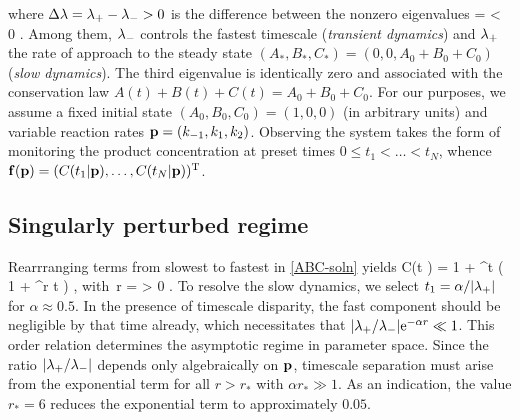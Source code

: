 \label{ABC-soln}
\ee
%
where $\Delta\lambda = \lambda_+-\lambda_- > 0$ is the difference between the nonzero eigenvalues
%
\be
 \lpm
=
<
 0 .
\label{ABC-lambda}
\ee
%
Among them, $\lambda_-$ controls the fastest timescale (\emph{transient dynamics})
and $\lambda_+$ the rate of approach to the steady state $(A_*,B_*,C_*)=(0,0,A_0+B_0+C_0)$ (\emph{slow dynamics}).
The third eigenvalue is identically zero and associated with the conservation law $A(t)+B(t)+C(t)=A_0+B_0+C_0$.
For our purposes, we assume a fixed initial state $(A_0,B_0,C_0)=(1,0,0)$
(in arbitrary units) and variable reaction rates $\mathbf{p} = (k_{-1},k_1,k_2)$.
Observing the system takes the form of monitoring the product concentration at preset times $0 \le t_1 < \ldots < t_N$,
whence $\mathbf{f}(\mathbf{p}) = (C(t_1 \vert \mathbf{p}) , \ldots , C(t_N \vert \mathbf{p}))^\mathrm{T}$.

\subsection{Singularly perturbed regime}
%
Rearrranging terms from slowest to fastest in \eqref{ABC-soln} yields
%
\be
 C(t \vert \p)
=
 1
+
 \frac{\lm}{\dl}
 ^{\lp t}
\left(
 1
+
 \frac{\lp}{\lm}
 ^{r \lp t}
\right) ,
\quad\mbox{with}\
 r = \frac{\dl}{|\lp|} > 0 .
\label{ABC-C-soln}
\ee
%
To resolve the slow dynamics, we select $t_1 = \alpha/|\lambda_+|$ for $\alpha \approx 0.5$.
In the presence of timescale disparity, the fast component should be negligible by that time already,
which necessitates that $\vert\lambda_+/\lambda_-\vert \mathrm{e}^{-\alpha r} \ll 1$.
This order relation determines the asymptotic regime in parameter space.
Since the ratio $\vert\lambda_+/\lambda_-\vert$ depends only algebraically on $\mathbf{p}$,
timescale separation must arise from the exponential term
for all $r> r_*$ with $\alpha r_* \gg 1$.
As an indication, the value $r_* = 6$ reduces the exponential term to approximately $0.05$.\\

